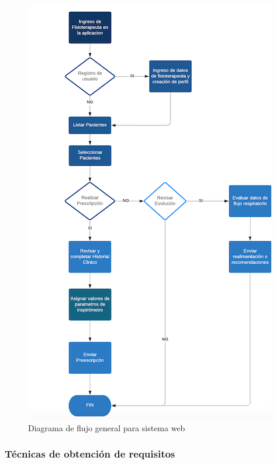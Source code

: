 \documentclass[12pt]{article}
\begin{document}
\begin{figure}[ht]
\centering
\includegraphics[scale=0.45]{imag/DiagramaFlujo.png}
\caption{Diagrama de flujo general para sistema web }
\label{5}
\end{figure}
\FloatBarrier


\newpage

\subsubsection{Técnicas de obtención de requisitos}
\end{document}

